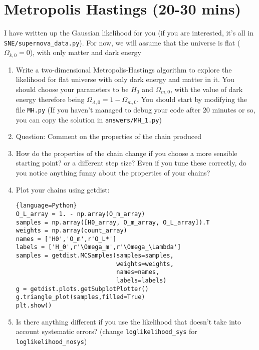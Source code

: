 \documentclass{article}
\begin{document}
\section{Metropolis Hastings (20-30 mins)}
I have written up the Gaussian likelihood for you (if you are interested, it's all in \lstinline{SNE/supernova_data.py}). For now, we will assume that the universe is flat ($\Omega_{k,0} = 0$), with only matter and dark energy
\begin{enumerate}[resume]
    \item Write a two-dimensional Metropolis-Hastings algorithm to explore the likelihood for flat universe with only dark energy and matter in it. You should choose your parameters to be $H_0$ and $\Omega_{m,0}$, with the value of dark energy therefore being $\Omega_{\Lambda,0} = 1-\Omega_{m,0}$. You should start by modifying the file \lstinline{MH.py} (If you haven't managed to debug your code after 20 minutes or so, you can copy the solution in \lstinline{answers/MH_1.py})
    \item Question: Comment on the properties of the chain produced
    \item How do the properties of the chain change if you choose a more sensible starting point? or a different step size? Even if you tune these correctly, do you notice anything funny about the properties of your chains?
    \item Plot your chains using getdist:
        \begin{lstlisting}{language=Python}
O_L_array = 1. - np.array(O_m_array)
samples = np.array([H0_array, O_m_array, O_L_array]).T
weights = np.array(count_array)
names = ['H0','O_m',r'O_L*']
labels = ['H_0',r'\Omega_m',r'\Omega_\Lambda']
samples = getdist.MCSamples(samples=samples, 
                            weights=weights, 
                            names=names, 
                            labels=labels)
g = getdist.plots.getSubplotPlotter()
g.triangle_plot(samples,filled=True)
plt.show()
        \end{lstlisting}

    \item Is there anything different if you use the likelihood that doesn't take into account systematic errors? (change \lstinline{loglikelihood_sys} for \lstinline{loglikelihood_nosys})
\end{enumerate}
\end{document}
